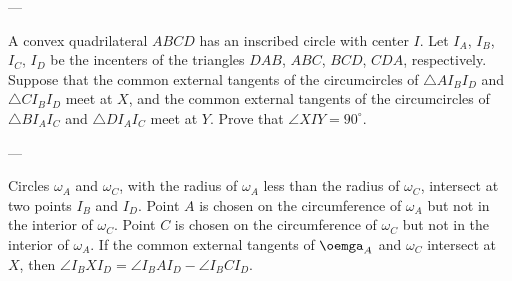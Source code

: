 
---

A convex quadrilateral $ABCD$ has an inscribed circle with center $I$. Let $I_A$, $I_B$, $I_C$, $I_D$ be the incenters of the triangles $DAB$, $ABC$, $BCD$, $CDA$, respectively. Suppose that the common external tangents of the circumcircles of $\triangle AI_BI_D$ and $\triangle CI_BI_D$ meet at $X$, and the common external tangents of the circumcircles of $\triangle BI_AI_C$ and $\triangle DI_AI_C$ meet at $Y$. Prove that $\angle XIY=90^\circ$.

---

\begin{boxlemma*}
    Circles $\omega_A$ and $\omega_C$, with the radius of $\omega_A$ less than the radius of $\omega_C$, intersect at two points $I_B$ and $I_D$. Point $A$ is chosen on the circumference of $\omega_A$ but not in the interior of $\omega_C$. Point $C$ is chosen on the circumference of $\omega_C$ but not in the interior of $\omega_A$. If the common external tangents of $\oemga_A$ and $\omega_C$ intersect at $X$, then $\angle I_BXI_D=\angle I_BAI_D-\angle I_BCI_D$.
\end{boxlemma*}
